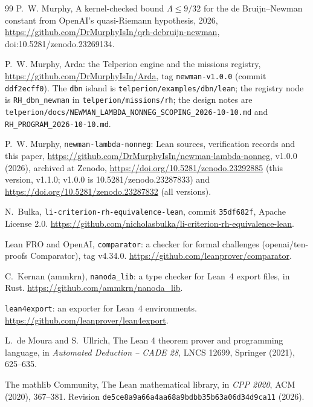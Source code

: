 \documentclass[11pt]{article}
\theoremstyle{definition}
\begin{document}
\begin{thebibliography}{99}
 P.~W. Murphy, A kernel-checked bound $\Lambda \le 9/32$ for the de Bruijn--Newman constant from OpenAI's quasi-Riemann hypothesis, 2026, \url{https://github.com/DrMurphyIsIn/qrh-debruijn-newman}, doi:10.5281/zenodo.23269134.

 P.~W. Murphy, Arda: the Telperion engine and the missions registry, \url{https://github.com/DrMurphyIsIn/Arda}, tag \texttt{newman-v1.0.0} (commit \texttt{ddf2ecff0}). The \texttt{dbn} island is \texttt{telperion/examples/dbn/lean}; the registry node is \texttt{RH\_dbn\_newman} in \texttt{telperion/missions/rh}; the design notes are \texttt{telperion/docs/NEWMAN\_LAMBDA\_NONNEG\_SCOPING\_2026-10-10.md} and \texttt{RH\_PROGRAM\_2026-10-10.md}.

 P.~W. Murphy, \texttt{newman-lambda-nonneg}: Lean sources, verification records and this paper, \url{https://github.com/DrMurphyIsIn/newman-lambda-nonneg}, v1.0.0 (2026), archived at Zenodo, \url{https://doi.org/10.5281/zenodo.23292885} (this version, v1.1.0; v1.0.0 is 10.5281/zenodo.23287833) and \url{https://doi.org/10.5281/zenodo.23287832} (all versions).

 N.~Bulka, \texttt{li-criterion-rh-equivalence-lean}, commit \texttt{35df682f}, Apache License 2.0. \url{https://github.com/nicholasbulka/li-criterion-rh-equivalence-lean}.

 Lean FRO and OpenAI, \texttt{comparator}: a checker for formal challenges (openai/ten-proofs Comparator), tag v4.34.0. \url{https://github.com/leanprover/comparator}.

 C.~Kernan (ammkrn), \texttt{nanoda\_lib}: a type checker for Lean~4 export files, in Rust. \url{https://github.com/ammkrn/nanoda_lib}.

 \texttt{lean4export}: an exporter for Lean~4 environments. \url{https://github.com/leanprover/lean4export}.

 L.~de Moura and S.~Ullrich, The Lean 4 theorem prover and programming language, in \emph{Automated Deduction -- CADE 28}, LNCS 12699, Springer (2021), 625--635.

 The mathlib Community, The Lean mathematical library, in \emph{CPP 2020}, ACM (2020), 367--381. Revision \texttt{de5ce8a9a66a4aa68a9bdbb35b63a06d34d9ca11} (2026).

\end{thebibliography}

\appendix
\end{document}
